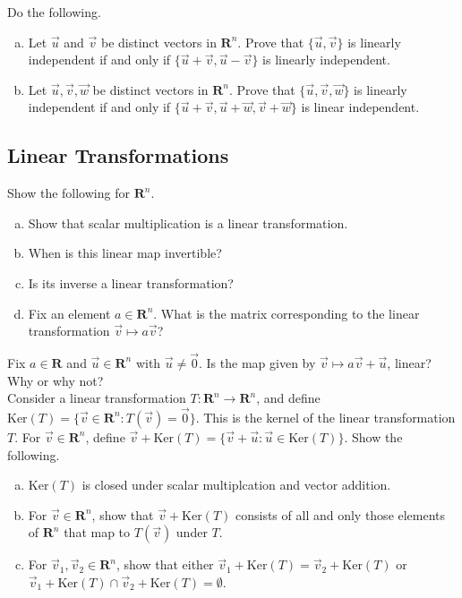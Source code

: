 \documentclass[a4paper,11pt]{article}
\newcommand{\R}{\mathbf{R}}
\begin{document}
 Do the following.
\begin{enumerate}[(a)]
\item Let $\vec u$ and $\vec v$ be distinct vectors in $\R^n$. Prove that
  $\{\vec u, \vec v\}$ is linearly independent if and only if $\{\vec u + \vec v,
  \vec u - \vec v\}$ is linearly independent.
\item Let $\vec u, \vec v, \vec w$ be distinct vectors in $\R^n$. Prove that
  $\{\vec u, \vec v, \vec w\}$ is linearly independent if and only if $\{\vec
  u+\vec v,\vec u+\vec w,\vec v+\vec w\}$ is linear independent. \\
\end{enumerate}

\subsection*{Linear Transformations}

 Show the following for $\R^n$.
\begin{enumerate}[(a)]
\item Show that scalar multiplication is a linear transformation.
\item When is this linear map invertible?
\item Is its inverse a linear transformation?
\item Fix an element $a \in \R^n$. What is the matrix corresponding to the
linear transformation $\vec v \mapsto a\vec v$? \\
\end{enumerate}

 Fix $a \in \R$ and $\vec u \in \R^n$ with $\vec
u \neq \vec 0$. Is the map given by $\vec v \mapsto a\vec v + \vec u$, linear?
Why or why not? \\

 Consider a linear transformation $T: \R^n
\rightarrow \R^n$, and define $\text{Ker}(T)=\{\vec v \in \R^n : T(\vec v)=\vec
0\}$. This is the kernel of the linear transformation $T$. For $\vec v \in
\R^n$, define $\vec v + \text{Ker}(T)=\{\vec v + \vec u : \vec u \in
\text{Ker}(T)\}$. Show the following.
\begin{enumerate}[(a)]
\item $\text{Ker}(T)$ is closed under scalar multiplcation and vector addition.
\item For $\vec v \in \R^n$, show that $\vec v + \text{Ker}(T)$ consists of all
  and only those elements of $\R^n$ that map to $T(\vec v)$ under $T$.
\item For $\vec v_1,\vec v_2 \in \R^n$, show that either $\vec
  v_1+\text{Ker}(T)=\vec v_2 +\text{Ker}(T)$ or $\vec v_1+\text{Ker}(T) \cap
  \vec v_2 +\text{Ker}(T)=\emptyset$.
\end{enumerate}
\end{document}
